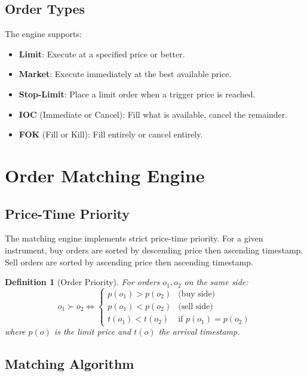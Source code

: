 \documentclass[11pt,a4paper]{article}
\newtheorem{definition}{Definition}[section]
\begin{document}
\subsection{Order Types}

The engine supports:
\begin{itemize}
    \item \textbf{Limit}: Execute at a specified price or better.
    \item \textbf{Market}: Execute immediately at the best available price.
    \item \textbf{Stop-Limit}: Place a limit order when a trigger price is reached.
    \item \textbf{IOC} (Immediate or Cancel): Fill what is available, cancel the remainder.
    \item \textbf{FOK} (Fill or Kill): Fill entirely or cancel entirely.
\end{itemize}

\section{Order Matching Engine}

\subsection{Price-Time Priority}

The matching engine implements strict price-time priority. For a given instrument, buy orders are sorted by descending price then ascending timestamp. Sell orders are sorted by ascending price then ascending timestamp.

\begin{definition}[Order Priority]
For orders $o_1, o_2$ on the same side:
\begin{equation}
    o_1 \succ o_2 \iff \begin{cases}
        p(o_1) > p(o_2) & \text{(buy side)} \\
        p(o_1) < p(o_2) & \text{(sell side)} \\
        t(o_1) < t(o_2) & \text{if } p(o_1) = p(o_2)
    \end{cases}
\end{equation}
where $p(o)$ is the limit price and $t(o)$ the arrival timestamp.
\end{definition}

\subsection{Matching Algorithm}
\end{document}
